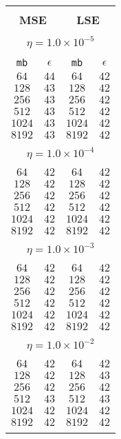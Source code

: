 \begin{center}
\begin{table}[]
\begin{center}
\begin{tabular}{@{}cc|cc@{}}
\hline\\[-11pt]
\hline\\[-6.5pt]
\multicolumn{2}{c}{\bf MSE} & \multicolumn{2}{c}{\bf LSE } \\[5pt]
\hline\\[-11pt]
\multicolumn{4}{c}{$\eta = 1.0\times 10^{-5}$} \\[5pt]
\hline\\[-11pt]
\texttt{mb} & \texttt{$\epsilon$} & \texttt{mb} & \texttt{$\epsilon$} \\[1pt]
$64$ & $44$  & $64$ & $42$ \\ [1pt]
$128$ & $43$   & $128$ & $42$ \\ [1pt]
$256$ & $43$   & $256$ & $42$ \\ [1pt]
$512$ & $43$   & $512$ & $42$ \\ [1pt]
$1024$ & $43$  & $1024$ & $42$ \\ [1pt]
$8192$ & $43$  & $8192$ & $42$ \\ [1pt]
\hline\\[-11pt]
\multicolumn{4}{c}{$\eta = 1.0\times 10^{-4}$} \\[5pt]
\hline\\[-11pt]
$64$ & $42$   & $64$ & $42$ \\ [1pt]
$128$ & $42$  & $128$ & $42$ \\ [1pt]
$256$ & $42$  & $256$ & $42$ \\ [1pt]
$512$ & $42$  & $512$ & $42$ \\ [1pt]
$1024$ & $42$  & $1024$ & $42$ \\ [1pt]
$8192$ & $42$  & $8192$ & $42$ \\ [1pt]
\hline\\[-11pt]
\multicolumn{4}{c}{$\eta = 1.0\times 10^{-3}$} \\[5pt]
\hline\\[-11pt]
$64$ & $42$  & $64$ & $42$ \\ [1pt]
$128$ & $42$   & $128$ & $42$ \\ [1pt]
$256$ & $42$   & $256$ & $42$ \\ [1pt]
$512$ & $42$   & $512$ & $42$ \\ [1pt]
$1024$ & $42$  & $1024$ & $42$ \\ [1pt]
$8192$ & $42$  & $8192$ & $42$ \\ [1pt]
\hline\\[-11pt]

\multicolumn{4}{c}{$\eta = 1.0\times 10^{-2}$} \\[5pt]
\hline\\[-11pt]
$64$ & $42$  & $64$ & $42$ \\ [1pt]
$128$ & $42$  & $128$ & $43$ \\ [1pt]
$256$ & $42$  & $256$ & $42$ \\ [1pt]
$512$ & $43$  & $512$ & $43$ \\ [1pt]
$1024$ & $42$  & $1024$ & $42$ \\ [1pt] 
$8192$ & $42$  & $8192$ & $42$ \\ [1pt] 
\hline\\[-11pt]


\end{tabular}
\end{center}
\end{table}
\end{center}
